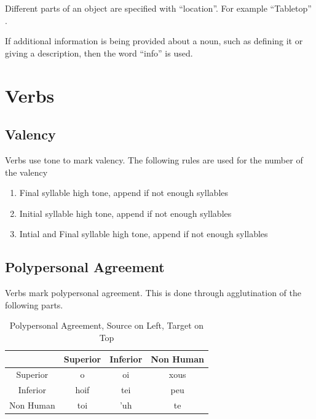 Different parts of an object are specified with  ``location''. For example ``Tabletop'' .

If additional information is being provided about a noun, such as defining it or giving a description, then the word  ``info'' is used.


\section{Verbs}

\subsection{Valency}

Verbs use tone to mark valency. The following rules are used for the number of the valency

\begin{enumerate}
    \item Final syllable high tone, append  if not enough syllables
    \item Initial syllable high tone, append  if not enough syllables
    \item Intial and Final syllable high tone, append  if not enough syllables
\end{enumerate}

\subsection{Polypersonal Agreement}

Verbs mark polypersonal agreement. This is done through agglutination of the following parts.

\begin{table}[H]
    \centering
    \begin{tabular}{c|c c c}
                    &   Superior    &   Inferior    &   Non Human   \\\hline
        Superior    &   \dU{}o      &   \tU{}oi     &   xous        \\
        Inferior    &   hoif        &   tei         &   peu         \\
        Non Human   &   toi         &   'uh         &   te          \\
    \end{tabular}
    \caption{Polypersonal Agreement, Source on Left, Target on Top}
    \label{tab:polyag}
\end{table}

